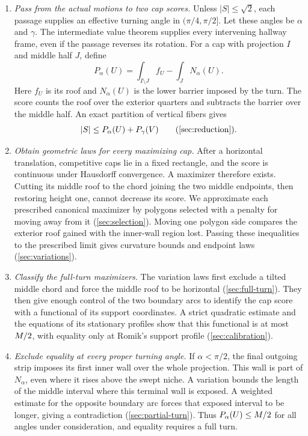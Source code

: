 \begin{enumerate}[label=(\arabic*)]
 \item \emph{Pass from the actual motions to two cap scores.}
 Unless $|S|\le\sqrt2$, each passage supplies an effective turning
 angle in $(\pi/4,\pi/2]$. Let these angles be $\alpha$ and $\gamma$.
 The intermediate value theorem supplies every intervening hallway
 frame, even if the passage reverses its rotation. For a cap with
 projection $I$ and middle half $J$, define
 \[
  P_\alpha(U)=\int_{I\setminus J}f_U
                    -\int_J N_\alpha(U).
 \]
 Here $f_U$ is its roof and $N_\alpha(U)$ is the lower barrier imposed
 by the turn. The score counts the roof over the exterior quarters
 and subtracts the barrier over the middle half. An exact partition
 of vertical fibers gives
 \[
  |S|\le P_\alpha(U)+P_\gamma(V)
  \qquad\text{(\cref{sec:reduction}).}
 \]
 \item \emph{Obtain geometric laws for every maximizing cap.}
 After a horizontal translation, competitive caps lie in a fixed
 rectangle, and the score is continuous under Hausdorff convergence.
 A maximizer therefore exists. Cutting its middle roof to the chord
 joining the two middle endpoints, then restoring height one,
 cannot decrease its score. We approximate each prescribed canonical
 maximizer by polygons selected with a penalty for moving away from
 it (\cref{sec:selection}). Moving one polygon side compares the
 exterior roof gained with the inner-wall region lost. Passing these
 inequalities to the prescribed limit gives curvature bounds and
 endpoint laws (\cref{sec:variations}).
 \item \emph{Classify the full-turn maximizers.}
 The variation laws first exclude a tilted middle chord and force the
 middle roof to be horizontal (\cref{sec:full-turn}). They then give
 enough control of the two boundary arcs to identify the cap score
 with a functional of its support coordinates. A strict quadratic
 estimate and the equations of its stationary profiles show that
 this functional is at most $M/2$, with equality only at Romik's
 support profile (\cref{sec:calibration}).
 \item \emph{Exclude equality at every proper turning angle.}
 If $\alpha<\pi/2$, the final outgoing strip imposes its first inner
 wall over the whole projection. This wall is part of $N_\alpha$,
 even where it rises above the swept niche. A variation bounds the
 length of the middle interval where this terminal wall is exposed.
 A weighted estimate for the opposite boundary arc forces that
 exposed interval to be longer, giving a contradiction
 (\cref{sec:partial-turn}). Thus $P_\alpha(U)\le M/2$ for all
 angles under consideration, and equality requires a full turn.
\end{enumerate}

